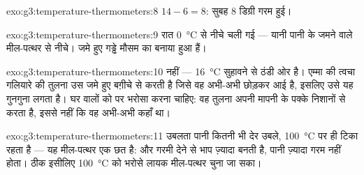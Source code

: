 \begin{solution}{exo:g3:temperature-thermometers:8}
$14 - 6 = 8$: सुबह $8$ डिग्री गरम हुई।
\end{solution}

\begin{solution}{exo:g3:temperature-thermometers:9}
रात \qty{0}{\celsius} से नीचे चली गई --- यानी पानी के जमने वाले
मील-पत्थर से नीचे। जमे हुए गड्ढे मौसम का बनाया हुआ  हैं।
\end{solution}

\begin{solution}{exo:g3:temperature-thermometers:10}
नहीं --- \qty{16}{\celsius} सुहावने से ठंडी ओर है। एम्मा की त्वचा
गलियारे की तुलना उस जमे हुए बग़ीचे से करती है जिसे वह अभी-अभी छोड़कर
आई है, इसलिए उसे यह गुनगुना लगता है। घर वालों को  पर भरोसा
करना चाहिए: वह तुलना अपनी मापनी के पक्के निशानों से करता है, इससे
नहीं कि वह अभी-अभी कहाँ था।
\end{solution}

\begin{solution}{exo:g3:temperature-thermometers:11}
उबलता पानी कितनी भी देर उबले, \qty{100}{\celsius} पर ही टिका रहता है
--- यह मील-पत्थर एक छत है: और गरमी देने से भाप ज़्यादा बनती है, पानी
ज़्यादा गरम नहीं होता। ठीक इसीलिए \qty{100}{\celsius} को भरोसे लायक
मील-पत्थर चुना जा सका।
\end{solution}
